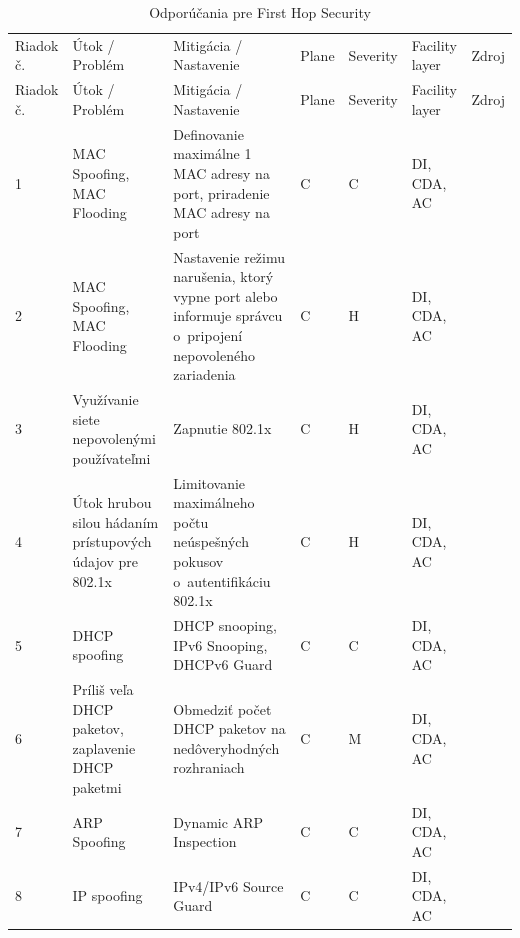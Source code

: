 \begin{longtable}[!htbp]{|C{2.5em}L{11em}L{11em}C{2.5em}C{4em}C{5em}L{2.5em}|}
	
	\caption{Odporúčania pre First Hop Security}
	\label{tab:fhs}\\ \hline
	\mbox{Riadok} č.&Útok / Problém	&Mitigácia / Nastavenie	&Plane	&Severity	&Facility layer	&Zdroj\\ \hhline{=======}
	\endfirsthead 
	\hline
	\centering
	
	Riadok č.	&Útok / Problém	&Mitigácia / Nastavenie	&Plane	&Severity	&Facility layer	&Zdroj\\ \hhline{=======}
	\endhead
	
	 1	&MAC Spoofing, MAC Flooding 	&Definovanie maximálne 1 MAC adresy na port, priradenie MAC adresy na port	&C	&C	&DI,
	CDA,
	AC	& \cite{Lammle2013}\\
	2	&MAC Spoofing, MAC Flooding 	&Nastavenie režimu narušenia, ktorý vypne port alebo informuje správcu o~pripojení nepovoleného zariadenia	&C	&H	&DI,
	CDA,
	AC	& \cite{Lammle2013}\\
	 3	&Využívanie siete nepovolenými používateľmi	&Zapnutie 802.1x 	&C	&H	&DI,
	CDA,
	AC	& \cite{Vyncke2008}
	
	\cite{Bouska20071}
	
	\cite{Bouska2007} \\
	4	&Útok hrubou silou hádaním prístupových údajov pre 802.1x 	&Limitovanie maximálneho počtu neúspešných pokusov o~autentifikáciu 802.1x	&C	&H	&DI,
	CDA,
	AC	& \cite{Vyncke2008}
	
	\cite{Bouska20071}
	
	\cite{Bouska2007} \\
	 5	&DHCP spoofing	&DHCP snooping, IPv6 Snooping, DHCPv6 Guard	&C	&C	&DI,
	CDA,
	AC	& \cite{Vyncke2008}
	
	\cite{Singh2018} 
	
	\cite{zXCpMaLbN1J7D1z2}\\
	6	&Príliš veľa DHCP paketov, zaplavenie DHCP paketmi	&Obmedziť počet DHCP paketov na nedôveryhodných rozhraniach	&C	&M	&DI,
	CDA,
	AC	& \cite{Vyncke2008}
	
	\cite{Singh2018}
	
	\cite{zXCpMaLbN1J7D1z2}\\
	 7	&ARP Spoofing	&Dynamic ARP Inspection	&C	&C	&DI,
	CDA,
	AC	& \cite{McMillan2018}\\
	8	&IP spoofing	&IPv4/IPv6 Source Guard	&C	&C	&DI,
	CDA,
	AC	& \cite{Singh2018}
	

\end{longtable}

